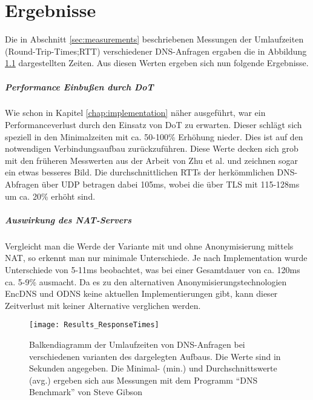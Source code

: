 \chapter{Ergebnisse}
\label{chap:results}

Die in Abschnitt \ref{sec:measurements} beschriebenen Messungen der Umlaufzeiten (Round-Trip-Times;RTT) verschiedener DNS-Anfragen ergaben die in Abbildung \ref{img:results-times} dargestellten Zeiten. Aus diesen Werten ergeben sich nun folgende Ergebnisse.

\paragraph{Performance Einbußen durch DoT}
Wie schon in Kapitel \ref{chap:implementation} näher ausgeführt, war ein Performanceverlust durch den Einsatz von DoT zu erwarten. Dieser schlägt sich speziell in den Minimalzeiten mit ca. 50-100\% Erhöhung nieder. Dies ist auf den notwendigen Verbindungsaufbau zurückzuführen. Diese Werte decken sich grob mit den früheren Messwerten aus der Arbeit von Zhu et al.\cite{Zhu2015} und zeichnen sogar ein etwas besseres Bild. Die durchschnittlichen RTTs der herkömmlichen DNS-Abfragen über UDP betragen dabei 105ms, wobei die über TLS mit 115-128ms um ca. 20\% erhöht sind.

\paragraph{Auswirkung des NAT-Servers}
Vergleicht man die Werde der Variante mit und ohne Anonymisierung mittels NAT, so erkennt man nur minimale Unterschiede. Je nach Implementation wurde Unterschiede von 5-11ms beobachtet, was bei einer Gesamtdauer von ca. 120ms ca. 5-9\% ausmacht. Da es zu den alternativen Anonymisierungstechnologien EncDNS und ODNS keine aktuellen Implementierungen gibt, kann dieser Zeitverlust mit keiner Alternative verglichen werden.

\begin{figure}[hb]
    \centering
    \texttt{[image: Results\_ResponseTimes]}
    \caption{Balkendiagramm der Umlaufzeiten von DNS-Anfragen bei verschiedenen varianten des dargelegten Aufbaus. Die Werte sind in Sekunden angegeben. Die Minimal- (min.) und Durchschnittswerte (avg.) ergeben sich aus Messungen mit dem Programm ``DNS Benchmark'' von Steve Gibson}
    \label{img:results-times}
\end{figure}